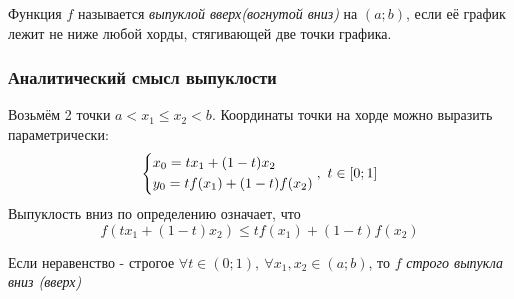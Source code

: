 \begin{definition}
	Функция $f$ называется \textit{выпуклой вверх(вогнутой вниз)} на $(a; b)$, если её график лежит не ниже любой хорды, стягивающей две точки графика.
\end{definition}



\subsubsection*{Аналитический смысл выпуклости}

Возьмём 2 точки $a < x_1 \le x_2 < b$. Координаты точки на хорде можно выразить параметрически:
\[
	\left\{\begin{aligned}
		&x_0 = tx_1 + (1 - t)x_2
		\\
		&y_0 = tf(x_1) + (1 - t)f(x_2)
	\end{aligned}\right.
	,\ t \in [0; 1]
\]
Выпуклость вниз по определению означает, что
\[
	f(tx_1 + (1 - t)x_2) \le tf(x_1) + (1 - t)f(x_2)
\]

\begin{note}
	Если неравенство - строгое $\forall t \in (0; 1),\ \forall x_1, x_2 \in (a; b)$, то $f$ \textit{строго выпукла вниз (вверх)}
\end{note}